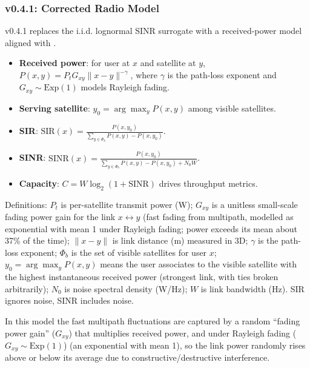 \documentclass[11pt,a4paper]{article}
\begin{document}
\subsubsection{v0.4.1: Corrected Radio Model}
v0.4.1 replaces the i.i.d. lognormal SINR surrogate with a received-power model aligned with
\cite{gomez2018stochastic}.
\begin{itemize}
    \item \textbf{Received power}: for user at $x$ and satellite at $y$,
    $P(x,y)=P_t G_{xy}\|x-y\|^{-\gamma}$, where $\gamma$ is the path-loss exponent and
    $G_{xy}\sim \mathrm{Exp}(1)$ models Rayleigh fading.
    \item \textbf{Serving satellite}: $y_0=\arg\max_y P(x,y)$ among visible satellites.
    \item \textbf{SIR}: $\mathrm{SIR}(x)=\frac{P(x,y_0)}{\sum_{y\in \Phi_b} P(x,y)-P(x,y_0)}$.
    \item \textbf{SINR}: $\mathrm{SINR}(x)=\frac{P(x,y_0)}{\sum_{y\in \Phi_b} P(x,y)-P(x,y_0)+N_0 W}$.
    \item \textbf{Capacity}: $C=W\log_2(1+\mathrm{SINR})$ drives throughput metrics.
\end{itemize}
Definitions: $P_t$ is per-satellite transmit power (W); $G_{xy}$ is a unitless small-scale
fading power gain for the link $x\leftrightarrow y$ (fast fading from multipath, modelled as
exponential with mean 1 under Rayleigh fading; power exceeds its mean about 37\% of the time);
$\|x-y\|$ is link distance (m) measured in 3D;
$\gamma$ is the path-loss exponent; $\Phi_b$ is the set of visible satellites for user $x$;
$y_0=\arg\max_y P(x,y)$ means the user associates to the visible satellite with the highest
instantaneous received power (strongest link, with ties broken arbitrarily); $N_0$ is noise
spectral density (W/Hz); $W$ is link bandwidth (Hz). SIR ignores noise, SINR includes noise.

In this model the fast multipath fluctuations are captured by a random “fading power gain” ($G_{xy}$)
that multiplies received power, and under Rayleigh fading ($G_{xy}\sim \mathrm{Exp}(1)$)
(an exponential with mean 1), so the link power randomly rises above or below its average due to
constructive/destructive interference.
\end{document}
